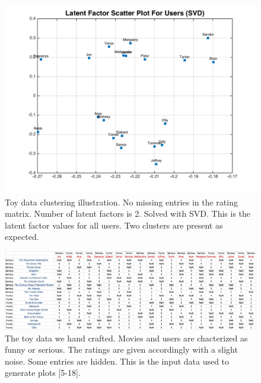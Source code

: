 \documentclass[11pt]{article}
\begin{document}
	\begin{figure}[H]
		\centering		
		\includegraphics[width=\wi]{buff1/svd_user}
		\caption{Toy data clustering illustration. No missing entries in the rating matrix. Number of latent factors is 2. Solved with SVD. This is the latent factor values for all users. Two clusters are present as expected.}
		\label{7}		
	\end{figure}
	
				
	
	\clearpage
	\begin{figure}[H]
		\centering		
		\includegraphics[width=\columnwidth]{buff2/data}
		\caption{The toy data we hand crafted. Movies and users are chacterized as funny or serious. The ratings are given accordingly with a slight noise. Some entries are hidden. This is the input data used to generate plots [5-18].}
		\label{5}		
	\end{figure}
	
\end{document}
